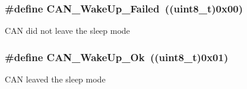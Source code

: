 \subsubsection[{C\+A\+N\+\_\+\+Wake\+Up\+\_\+\+Failed}]{\setlength{\rightskip}{0pt plus 5cm}\#define C\+A\+N\+\_\+\+Wake\+Up\+\_\+\+Failed~((uint8\+\_\+t)0x00)}\label{group___c_a_n__wake__up__constants_ga837fd7ad47fee78e43a186544e2b390b}
C\+A\+N did not leave the sleep mode \hypertarget{group___c_a_n__wake__up__constants_ga152e4935cf85bdfb803eb36b656cd690}{}
\subsubsection[{C\+A\+N\+\_\+\+Wake\+Up\+\_\+\+Ok}]{\setlength{\rightskip}{0pt plus 5cm}\#define C\+A\+N\+\_\+\+Wake\+Up\+\_\+\+Ok~((uint8\+\_\+t)0x01)}\label{group___c_a_n__wake__up__constants_ga152e4935cf85bdfb803eb36b656cd690}
C\+A\+N leaved the sleep mode 